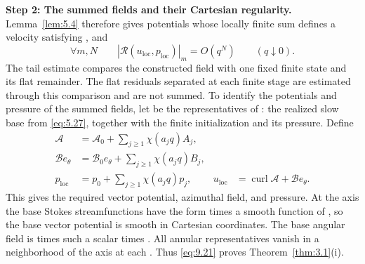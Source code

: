 \noindent\textbf{Step 2: The summed fields and their Cartesian regularity.} Lemma~\ref{lem:5.4}
therefore gives potentials whose locally finite sum defines a velocity satisfying
, and
\begin{equation}
\forall m,N\qquad |\mathscr R(u_{\mathrm{loc}},p_{\mathrm{loc}})|_m=O(q^N)
\qquad(q\downarrow0).
\tag{9.20}\label{eq:9.20}
\end{equation}
The tail estimate compares the constructed field with one fixed finite state and its flat remainder.
The flat residuals separated at each finite stage are estimated through this comparison and are not
summed. To identify the potentials and pressure of the summed fields, let
 be the representatives of
: the realized slow base from \eqref{eq:5.27}, together with the finite
initialization and its pressure. Define
\begin{equation}
\begin{aligned}
\mathcal A&=\mathcal A_0+\sum_{j\geq1}\chi(a_jq)A_j,\\
\mathcal Be_\theta&=\mathcal B_0e_\theta+\sum_{j\geq1}\chi(a_jq)B_j,\\
p_{\mathrm{loc}}&=p_0+\sum_{j\geq1}\chi(a_jq)p_j,
&u_{\mathrm{loc}}&=\operatorname{curl}\mathcal A+\mathcal Be_\theta.
\end{aligned}
\tag{9.21}\label{eq:9.21}
\end{equation}
This gives the required vector potential, azimuthal field, and pressure. At the axis the base Stokes
streamfunctions have the form  times a smooth function of
, so the base vector potential is smooth in Cartesian coordinates.
The base angular field is  times such a scalar times
. All annular representatives vanish in a neighborhood of the axis
at each . Thus \eqref{eq:9.21} proves
Theorem~\ref{thm:3.1}\textup{(i)}.

